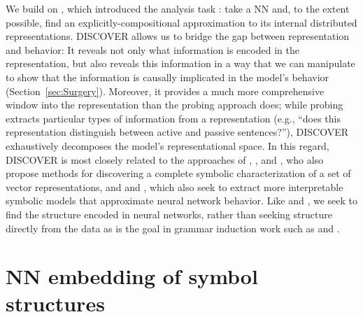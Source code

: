 We build on \citet{mccoy}, which introduced the analysis task :  take a NN and, to the extent possible, find an explicitly-compositional approximation to its internal distributed representations. DISCOVER allows us to bridge the gap between representation and behavior: It reveals not only what information is encoded in the representation, but also reveals this information in a way that we can manipulate to show that the information is causally implicated in the model's behavior (Section~\ref{sec:Surgery}). Moreover, it provides a much more comprehensive window into the representation than the probing approach does; while probing extracts particular types of information from a representation (e.g., ``does this representation distinguish between active and passive sentences?''), DISCOVER exhaustively decomposes the model's representational space. In this regard, DISCOVER is most closely related to the approaches of \citet{andreas2019measuring}, \citet{chrupala2019correlating}, and \citet{abnar2019blackbox}, who also propose methods for discovering a complete symbolic characterization of a set of vector representations, and \citet{omlin1996extraction} and \citet{weiss2018extracting}, which also seek to extract  more interpretable symbolic models that approximate neural network behavior.
Like \citet{andreas2019measuring} and \citet{chrupala2019correlating}, we seek to find the structure encoded in neural networks, rather than seeking structure directly from the data as is the goal in grammar induction work such as \citet{shen2018ordered} and \citet{bowman2016fast}.

\section{NN embedding of symbol structures} \label{sec:TPR}

